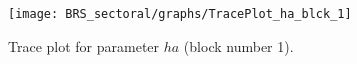 \begin{figure}[H]
\centering
  \texttt{[image: BRS\_sectoral/graphs/TracePlot\_ha\_blck\_1]}\\
    \caption{Trace plot for parameter ${ha}$ (block number 1).}
\end{figure}
